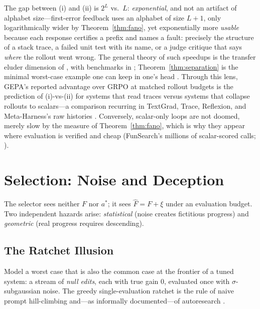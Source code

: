 \documentclass{article}
\theoremstyle{plain}
\theoremstyle{definition}
\theoremstyle{remark}
\newcommand{\Fhat}{\widehat{F}}
\begin{document}
The gap between (i) and (ii) is $2^L$ vs.\ $L$: \emph{exponential}, and not an artifact of alphabet size---first-error feedback uses an alphabet of size $L{+}1$, only logarithmically wider by Theorem~\ref{thm:fano}, yet exponentially more \emph{usable} because each response certifies a prefix and names a fault: precisely the structure of a stack trace, a failed unit test with its name, or a judge critique that says \emph{where} the rollout went wrong. The general theory of such speedups is the transfer eluder dimension of \citet{xu2025llf}, with benchmarks in \citet{cheng2023llfbench}; Theorem~\ref{thm:separation} is the minimal worst-case example one can keep in one's head \citep{shannon1948mathematical, cover2006elements}. Through this lens, GEPA's reported advantage over GRPO at matched rollout budgets \citep{agrawal2025gepa} is the prediction of (i)-vs-(ii) for systems that read traces versus systems that collapse rollouts to scalars---a comparison recurring in TextGrad, Trace, Reflexion, and Meta-Harness's raw histories \citep{yuksekgonul2024textgrad, cheng2024trace, shinn2023reflexion, lee2026metaharness}. Conversely, scalar-only loops are not doomed, merely slow by the measure of Theorem~\ref{thm:fano}, which is why they appear where evaluation is verified and cheap (FunSearch's millions of scalar-scored calls; \citealp{romeraparedes2024funsearch}).

\section{Selection: Noise and Deception}
\label{sec:selection}

The selector sees neither $F$ nor $a^*$; it sees $\Fhat = F + \xi$ under an evaluation budget. Two independent hazards arise: \emph{statistical} (noise creates fictitious progress) and \emph{geometric} (real progress requires descending).

\subsection{The Ratchet Illusion}
\label{sec:ratchet}

Model a worst case that is also the common case at the frontier of a tuned system: a stream of \emph{null edits}, each with true gain $0$, evaluated once with $\sigma$-subgaussian noise. The greedy single-evaluation ratchet is the rule of naive prompt hill-climbing and---as informally documented---of autoresearch \citep{karpathy2026autoresearch}.
\end{document}
